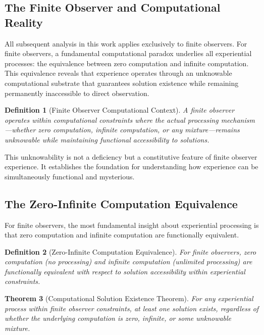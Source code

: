 \documentclass{article}
\newtheorem{theorem}{Theorem}[section]
\newtheorem{definition}[theorem]{Definition}
\begin{document}
\subsection{The Finite Observer and Computational Reality}

All subsequent analysis in this work applies exclusively to finite observers. For finite observers, a fundamental computational paradox underlies all experiential processes: the equivalence between zero computation and infinite computation. This equivalence reveals that experience operates through an unknowable computational substrate that guarantees solution existence while remaining permanently inaccessible to direct observation.

\begin{definition}[Finite Observer Computational Context]
A finite observer operates within computational constraints where the actual processing mechanism—whether zero computation, infinite computation, or any mixture—remains unknowable while maintaining functional accessibility to solutions.
\end{definition}

This unknowability is not a deficiency but a constitutive feature of finite observer experience. It establishes the foundation for understanding how experience can be simultaneously functional and mysterious.

\subsection{The Zero-Infinite Computation Equivalence}

For finite observers, the most fundamental insight about experiential processing is that zero computation and infinite computation are functionally equivalent.

\begin{definition}[Zero-Infinite Computation Equivalence]
For finite observers, zero computation (no processing) and infinite computation (unlimited processing) are functionally equivalent with respect to solution accessibility within experiential constraints.
\end{definition}

\begin{theorem}[Computational Solution Existence Theorem]
For any experiential process within finite observer constraints, at least one solution exists, regardless of whether the underlying computation is zero, infinite, or some unknowable mixture.
\end{theorem}
\end{document}

